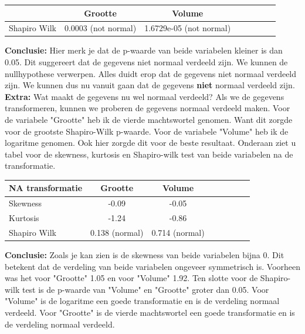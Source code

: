 \documentclass[12pt]{article}
\begin{document}
\newline\newline
\begin{tabular}{l*{6}{c}r}
   & Grootte & Volume \\
   \hline
   Shapiro Wilk & 0.0003 (not normal) & 1.6729e-05 (not normal) \\
\end{tabular}
\newline\newline\newline
\textbf{Conclusie:} Hier merk je dat de p-waarde van beide variabelen kleiner is dan 0.05.
Dit suggereert dat de gegevens niet normaal verdeeld zijn. We kunnen de nullhypothese verwerpen.
Alles duidt erop dat de gegevens niet normaal verdeeld zijn.
We kunnen dus nu vanuit gaan dat de gegevens \textbf{niet} normaal verdeeld zijn.
\newline\newline
\textbf{Extra:}
Wat maakt de gegevens nu wel normaal verdeeld?
Als we de gegevens transformeren, kunnen we proberen de gegevens normaal verdeeld maken.
\newline\newline
Voor de variabele "Grootte" heb ik de vierde machtswortel genomen.
Want dit zorgde voor de grootste Shapiro-Wilk p-waarde.
Voor de variabele "Volume" heb ik de logaritme genomen.
Ook hier zorgde dit voor de beste resultaat.
\newline\newline
Onderaan ziet u tabel voor de skewness, kurtosis en Shapiro-wilk test van beide variabelen na de transformatie.
\newline\newline
\begin{tabular}{l*{6}{c}r}
   \textbf{NA transformatie} & Grootte & Volume \\
   \hline
    Skewness & -0.09 & -0.05 \\
    Kurtosis & -1.24 & -0.86 \\
   Shapiro Wilk & 0.138 (normal) & 0.714 (normal) \\
\end{tabular}
\newline\newline\newline
\textbf{Conclusie:} Zoals je kan zien is de skewness van beide variabelen bijna 0.
Dit betekent dat de verdeling van beide variabelen ongeveer symmetrisch is. Voorheen was het voor "Grootte" 1.05 en voor "Volume" 1.92.
Ten slotte voor de Shapiro-wilk test is de p-waarde van "Volume" en "Grootte" groter dan 0.05.
Voor "Volume" is de logaritme een goede transformatie en is de verdeling normaal verdeeld.
Voor "Grootte" is de vierde machtswortel een goede transformatie en is de verdeling normaal verdeeld.
\end{document}
